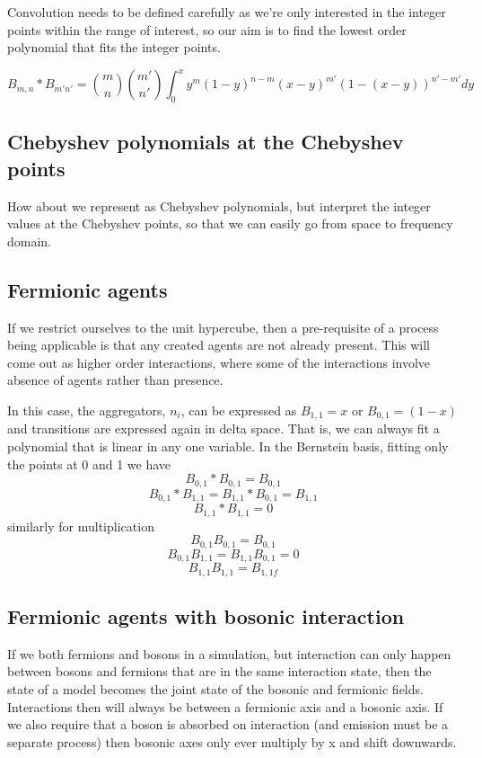 \documentclass[a4paper]{article}
\begin{document}
Convolution needs to be defined carefully as we're only interested in the integer points within the range of interest, so our aim is to find the lowest order polynomial that fits the integer points.

\[
B_{m,n} \ast B_{m'n'} =   {m \choose n}{m' \choose n'} \int_{0}^x y^m(1-y)^{n-m} (x-y)^{m'}(1-(x-y))^{n'-m'} dy
\]

\subsection{Chebyshev polynomials at the Chebyshev points}
How about we represent as Chebyshev polynomials, but interpret the integer values at the Chebyshev points, so that we can easily go from space to frequency domain.

\subsection{Fermionic agents}

If we restrict ourselves to the unit hypercube, then a pre-requisite of a process being applicable is that any created agents are not already present. This will come out as higher order interactions, where some of the interactions involve absence of agents rather than presence.

In this case, the aggregators, $n_i$, can be expressed as $B_{1,1}=x$ or $B_{0,1}=(1-x)$ and transitions are expressed again in delta space. That is, we can always fit a polynomial that is linear in any one variable. In the Bernstein basis, fitting only the points at 0 and 1 we have 
\[
B_{0,1} \ast B_{0,1} = B_{0,1}
\]
\[B_{0,1} \ast B_{1,1} = B_{1,1} \ast B_{0,1} = B_{1,1}\]
\[
B_{1,1} \ast B_{1,1} = 0
\]
similarly for multiplication
\[
B_{0,1}B_{0,1} = B_{0,1}
\]
\[
B_{0,1}B_{1,1} = B_{1,1}B_{0,1} = 0
\]
\[
B_{1,1}B_{1,1} = B_{1,1f}
\]

\subsection{Fermionic agents with bosonic interaction}

If we both fermions and bosons in a simulation, but interaction can only happen between bosons and fermions that are in the same interaction state, then the state of a model becomes the joint state of the bosonic and fermionic fields. Interactions then will always be between a fermionic axis and a bosonic axis. If we also require that a boson is absorbed on interaction (and emission must be a separate process) then bosonic axes only ever multiply by x and shift downwards.
\end{document}
